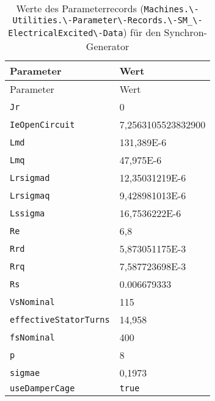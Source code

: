 \begin{longtable}[]{@{}ll@{}}
\caption{Werte des Parameterrecords
(\texttt{Machines.\textbackslash{}-Utilities.\textbackslash{}-Parameter\textbackslash{}-Records.\textbackslash{}-SM\_\textbackslash{}-ElectricalExcited\textbackslash{}-Data})
für den Synchron-Generator}\tabularnewline
\toprule
Parameter & Wert\tabularnewline
\midrule
\endfirsthead
\toprule
Parameter & Wert\tabularnewline
\midrule
\endhead
\texttt{Jr} & 0\tabularnewline
\texttt{IeOpenCircuit} & 7,2563105523832900\tabularnewline
\texttt{Lmd} & 131,389E-6\tabularnewline
\texttt{Lmq} & 47,975E-6\tabularnewline
\texttt{Lrsigmad} & 12,35031219E-6\tabularnewline
\texttt{Lrsigmaq} & 9,428981013E-6\tabularnewline
\texttt{Lssigma} & 16,7536222E-6\tabularnewline
\texttt{Re} & 6,8\tabularnewline
\texttt{Rrd} & 5,873051175E-3\tabularnewline
\texttt{Rrq} & 7,587723698E-3\tabularnewline
\texttt{Rs} & 0.006679333\tabularnewline
\texttt{VsNominal} & 115\tabularnewline
\texttt{effectiveStatorTurns} & 14,958\tabularnewline
\texttt{fsNominal} & 400\tabularnewline
\texttt{p} & 8\tabularnewline
\texttt{sigmae} & 0,1973\tabularnewline
\texttt{useDamperCage} & \texttt{true}\tabularnewline
\bottomrule
\end{longtable}

